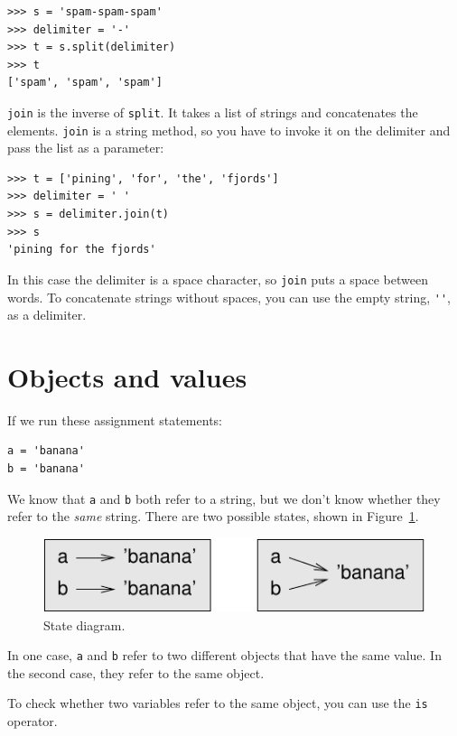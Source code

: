 \documentclass[10pt]{book}
\begin{document}
\begin{verbatim}
>>> s = 'spam-spam-spam'
>>> delimiter = '-'
>>> t = s.split(delimiter)
>>> t
['spam', 'spam', 'spam']
\end{verbatim}
%
{\tt join} is the inverse of {\tt split}.  It
takes a list of strings and
concatenates the elements.  {\tt join} is a string method,
so you have to invoke it on the delimiter and pass the
list as a parameter:

\begin{verbatim}
>>> t = ['pining', 'for', 'the', 'fjords']
>>> delimiter = ' '
>>> s = delimiter.join(t)
>>> s
'pining for the fjords'
\end{verbatim}
%
In this case the delimiter is a space character, so
{\tt join} puts a space between words.  To concatenate
strings without spaces, you can use the empty string,
\verb"''", as a delimiter. 


\section{Objects and values}
\label{equivalence}

If we run these assignment statements:

\begin{verbatim}
a = 'banana'
b = 'banana'
\end{verbatim}
%
We know that {\tt a} and {\tt b} both refer to a
string, but we don't
know whether they refer to the {\em same} string.
There are two possible states, shown in Figure~\ref{fig.list1}.

\begin{figure}
\centerline
{\includegraphics[scale=0.8]{figs/list1.pdf}}
\caption{State diagram.}
\label{fig.list1}
\end{figure}

In one case, {\tt a} and {\tt b} refer to two different objects that
have the same value.  In the second case, they refer to the same
object.

To check whether two variables refer to the same object, you can
use the {\tt is} operator.
\end{document}
